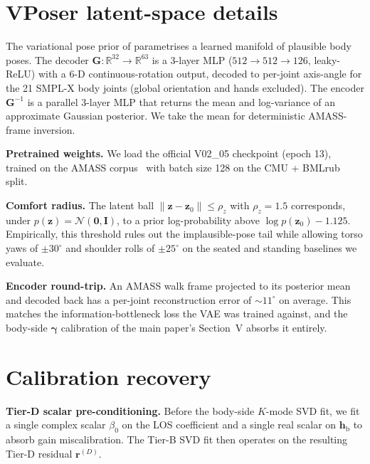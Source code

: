 \documentclass[10pt,journal,twocolumn]{IEEEtran}
\newcommand{\gammab}{\bm{\gamma}}
\newcommand{\hbody}{\bm{h}_{\mathrm{b}}}
\newcommand{\Reals}{\mathbb{R}}
\theoremstyle{plain}
\theoremstyle{definition}
\begin{document}
\section{VPoser latent-space details}\label{si:vposer}

The variational pose prior of \cite{Pavlakos2019VPoser} parametrises
a learned manifold of plausible body poses. The decoder
$\bm{G}: \Reals^{32} \to \Reals^{63}$ is a 3-layer MLP
($512 \to 512 \to 126$, leaky-ReLU) with a 6-D continuous-rotation
output, decoded to per-joint axis-angle for the 21 SMPL-X body joints
(global orientation and hands excluded). The encoder $\bm{G}^{-1}$
is a parallel 3-layer MLP that returns the mean and log-variance of
an approximate Gaussian posterior. We take the mean for deterministic
AMASS-frame inversion.

\textbf{Pretrained weights.} We load the official V02\_05 checkpoint
(epoch 13), trained on the AMASS corpus~\cite{AMASS2019} with batch
size 128 on the CMU + BMLrub split.

\textbf{Comfort radius.} The latent ball
$\|\bm{z} - \bm{z}_0\| \leq \rho_z$ with $\rho_z = 1.5$ corresponds,
under $p(\bm{z}) = \mathcal{N}(\bm{0}, \bm{I})$, to a prior
log-probability above $\log p(\bm{z}_0) - 1.125$. Empirically, this
threshold rules out the implausible-pose tail while allowing torso
yaws of $\pm 30^{\circ}$ and shoulder rolls of $\pm 25^{\circ}$ on
the seated and standing baselines we evaluate.

\textbf{Encoder round-trip.} An AMASS walk frame projected to its
posterior mean and decoded back has a per-joint reconstruction
error of $\sim\!11^{\circ}$ on average. This matches the
information-bottleneck loss the VAE was trained against, and the
body-side $\gammab$ calibration of the main paper's Section~V
absorbs it entirely.

\section{Calibration recovery}\label{si:calibration}

\textbf{Tier-D scalar pre-conditioning.} Before the body-side
$K$-mode SVD fit, we fit a single complex scalar $\beta_0$ on the
LOS coefficient and a single real scalar on $\hbody$ to absorb gain
miscalibration. The Tier-B SVD fit then operates on the resulting
Tier-D residual $\bm{r}^{(D)}$.
\end{document}

